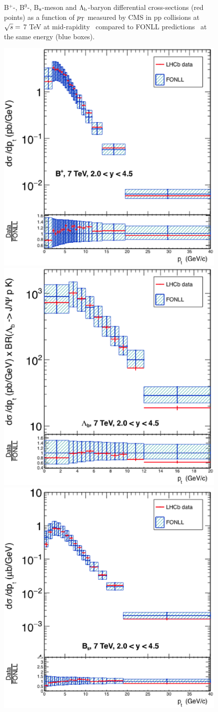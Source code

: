 \begin{figure}[!htbp]
\begin{center}
\caption{B$^{+}$-, B$^{0}$-, B$_{\rm s}$-meson and $\Lambda_{\rm b}$-baryon differential cross-sections (red points) as a function of $p_{\rm T}$ measured by CMS in pp collisions at $\sqrt{s} =$ 7 TeV at mid-rapidity~\cite{Khachatryan:2011mk,Chatrchyan:2011pw,Chatrchyan:2011vh,Chatrchyan:2012xg} compared to FONLL predictions~\cite{Cacciari:1998it, Cacciari:2001td} at the same energy (blue boxes). }
\label{fig:Bmesons}
\end{center}
\end{figure}
\begin{figure}[!htbp]
\begin{center}
\includegraphics[width=.45\textwidth]{FigCap4/Bplus_7TeV_y_20_45_FF35.eps}
\includegraphics[width=.45\textwidth]{FigCap4/Lambdab_7TeV_y_20_45_FF21_BR6.eps}
\includegraphics[width=.45\textwidth]{FigCap4/Bs_7TeV_y_20_45.eps}

\end{center}
\end{figure}
